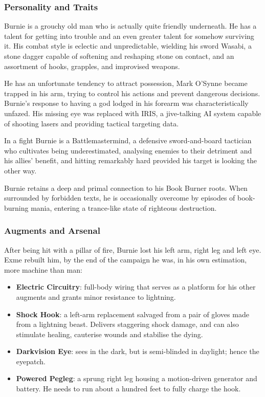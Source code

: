 \subsubsection{Personality and Traits}

Burnie is a grouchy old man who is actually quite friendly underneath.  He has a talent for getting into trouble and an even greater talent for somehow surviving it.  His combat style is eclectic and unpredictable, wielding his sword Wasabi, a stone dagger capable of softening and reshaping stone on contact, and an assortment of hooks, grapples, and improvised weapons.

He has an unfortunate tendency to attract possession, Mark O'Synne became trapped in his arm, trying to control his actions and prevent dangerous decisions.  Burnie's response to having a god lodged in his forearm was characteristically unfazed.  His missing eye was replaced with IRIS, a jive-talking AI system capable of shooting lasers and providing tactical targeting data.

In a fight Burnie is a Battlemastermind, a defensive sword-and-board tactician who cultivates being underestimated, analysing enemies to their detriment and his allies' benefit, and hitting remarkably hard provided his target is looking the other way.

Burnie retains a deep and primal connection to his Book Burner roots.  When surrounded by forbidden texts, he is occasionally overcome by episodes of book-burning mania, entering a trance-like state of righteous destruction.

\subsubsection{Augments and Arsenal}

After being hit with a pillar of fire, Burnie lost his left arm, right leg and left eye.  Exme rebuilt him, by the end of the campaign he was, in his own estimation, more machine than man:

\begin{itemize}
  \item \textbf{Electric Circuitry}: full-body wiring that serves as a platform for his other augments and grants minor resistance to lightning.
  \item \textbf{Shock Hook}: a left-arm replacement salvaged from a pair of gloves made from a lightning beast.  Delivers staggering shock damage, and can also stimulate healing, cauterise wounds and stabilise the dying.
  \item \textbf{Darkvision Eye}: sees in the dark, but is semi-blinded in daylight; hence the eyepatch.
  \item \textbf{Powered Pegleg}: a sprung right leg housing a motion-driven generator and battery.  He needs to run about a hundred feet to fully charge the hook.
\end{itemize}

